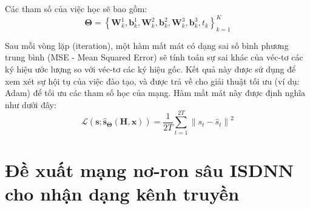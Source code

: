 
Các tham số của việc học sẽ bao gồm:
\begin{equation}
\boldsymbol{\Theta}=\left\{\mathbf{W}^1_{k}, \mathbf{b}^1_{k}, \mathbf{W}^2_{k}, \mathbf{b}^2_{k}, \mathbf{W}^3_{k}, \mathbf{b}^3_{ k}, t_k\right\}_{k=1}^K
\end{equation}

Sau mỗi vòng lặp (iteration), một hàm mất mát có dạng sai số bình phương trung bình (MSE - Mean Squared Error) sẽ tính toán sự sai khác của véc-tơ các ký hiệu ước lượng so với véc-tơ các ký hiệu gốc. Kết quả này được sử dụng để xem xét sự hội tụ của việc đào tạo, và được trả về cho giải thuật tối ưu (ví dụ: Adam) để tối ưu các tham số học của mạng. Hàm mất mát này được định nghĩa như dưới đây:
\begin{equation}
\label{eq:lossdetnet}
    \mathcal{L}(\mathbf{s} ; \hat{\mathbf{s}}_{\boldsymbol{\Theta}}(\mathbf{H}, \mathbf{x}))= \frac{1}{2T} \sum_{t=1}^{2T} {\left\| s_t-\hat{s}_t\right\|^2}
\end{equation}

\section{Đề xuất mạng nơ-ron sâu ISDNN cho nhận dạng kênh truyền}
